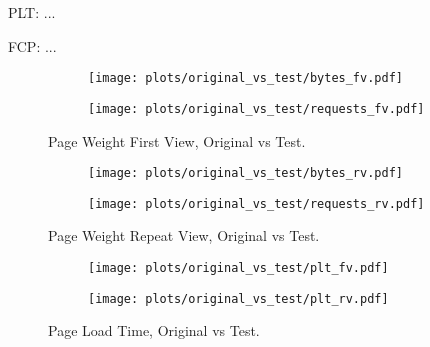 PLT: ...

FCP: ...




\begin{figure}
	\centering
	\begin{subfigure}{.5\textwidth}
		\centering
		\texttt{[image: plots/original\_vs\_test/bytes\_fv.pdf]}
		\label{fig:sub1}
	\end{subfigure}%
	\begin{subfigure}{.5\textwidth}
		\centering
		\texttt{[image: plots/original\_vs\_test/requests\_fv.pdf]}
		\label{fig:sub2}
	\end{subfigure}
	\caption{Page Weight First View, Original vs Test.}
	\label{figure:plt_original_test}
\end{figure}

\begin{figure}
	\centering
	\begin{subfigure}{.5\textwidth}
		\centering
		\texttt{[image: plots/original\_vs\_test/bytes\_rv.pdf]}
		\label{fig:sub1}
	\end{subfigure}%
	\begin{subfigure}{.5\textwidth}
		\centering
		\texttt{[image: plots/original\_vs\_test/requests\_rv.pdf]}
		\label{fig:sub2}
	\end{subfigure}
	\caption{Page Weight Repeat View, Original vs Test.}
	\label{figure:plt_original_test}
\end{figure}


\begin{figure}
	\centering
	\begin{subfigure}{.5\textwidth}
		\centering
		\texttt{[image: plots/original\_vs\_test/plt\_fv.pdf]}
		\label{fig:sub1}
	\end{subfigure}%
	\begin{subfigure}{.5\textwidth}
		\centering
		\texttt{[image: plots/original\_vs\_test/plt\_rv.pdf]}
		\label{fig:sub2}
	\end{subfigure}
	\caption{Page Load Time, Original vs Test.}
	\label{figure:plt_original_test}
\end{figure}


